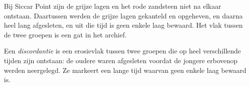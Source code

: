 Bij Siccar Point zijn de grijze lagen en het rode zandsteen niet na elkaar
ontstaan. Daartussen werden de grijze lagen gekanteld en opgeheven, en
daarna heel lang afgesleten, en uit die tijd is geen enkele laag bewaard.
Het vlak tussen de twee groepen  is een gat in het archief.

\begin{definition}[Discordantie]\label{def:g7:geological-time:unconformity}
Een \emph{discordantie} is een erosievlak tussen twee
groepen  die op heel verschillende tijden zijn ontstaan: de
oudere  waren afgesleten voordat de jongere erbovenop werden
neergelegd. Ze markeert een lange tijd waarvan geen enkele laag bewaard is.
\end{definition}

